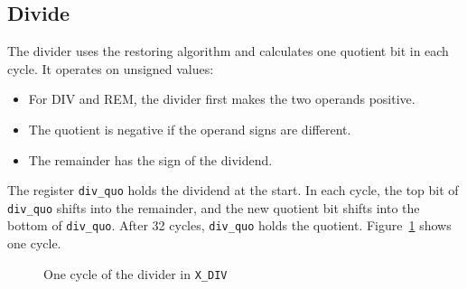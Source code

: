 \subsection{Divide}

The divider uses the restoring algorithm and calculates one quotient bit in each cycle. It operates on unsigned values:

\begin{itemize}
  \item For DIV and REM, the divider first makes the two operands positive.
  \item The quotient is negative if the operand signs are different.
  \item The remainder has the sign of the dividend.
\end{itemize}

The register \texttt{div\_quo} holds the dividend at the start. In each cycle, the top bit of \texttt{div\_quo} shifts into the remainder, and the new quotient bit shifts into the bottom of \texttt{div\_quo}. After 32 cycles, \texttt{div\_quo} holds the quotient. Figure~\ref{fig:divflow} shows one cycle.

\begin{figure}[H]
  \centering
  \caption{One cycle of the divider in \texttt{X\_DIV}}
  \label{fig:divflow}
\end{figure}


